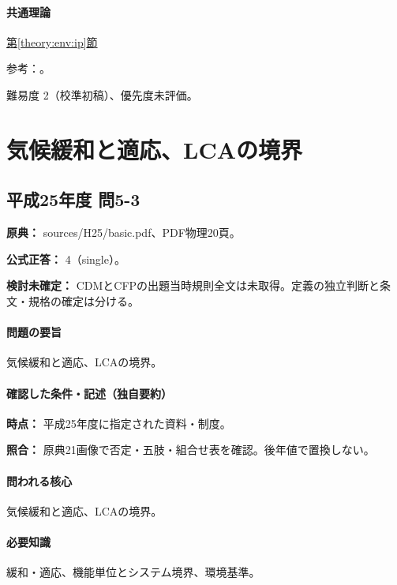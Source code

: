 \paragraph{共通理論} \hyperref[theory:env:ip]{第\ref*{theory:env:ip}節}

\par 参考：\cite{ip_patent_statute,ip_broad_scope}。

\par 難易度 2（校準初稿）、優先度未評価。

\section{気候緩和と適応、LCAの境界}

\subsection{平成25年度 問5-3}
\label{q:h25-reg-basic-5-3}

\noindent\textbf{原典：} sources/H25/basic.pdf、PDF物理20頁。

\textbf{公式正答：} 4（single）。

\par\textbf{検討未確定：} CDMとCFPの出題当時規則全文は未取得。定義の独立判断と条文・規格の確定は分ける。

\paragraph{問題の要旨} 気候緩和と適応、LCAの境界。

\paragraph{確認した条件・記述（独自要約）}\mbox{}\par

\noindent\textbf{時点：} 平成25年度に指定された資料・制度。\par

\noindent\textbf{照合：} 原典21画像で否定・五肢・組合せ表を確認。後年値で置換しない。\par

\paragraph{問われる核心} 気候緩和と適応、LCAの境界。

\paragraph{必要知識} 緩和・適応、機能単位とシステム境界、環境基準。

